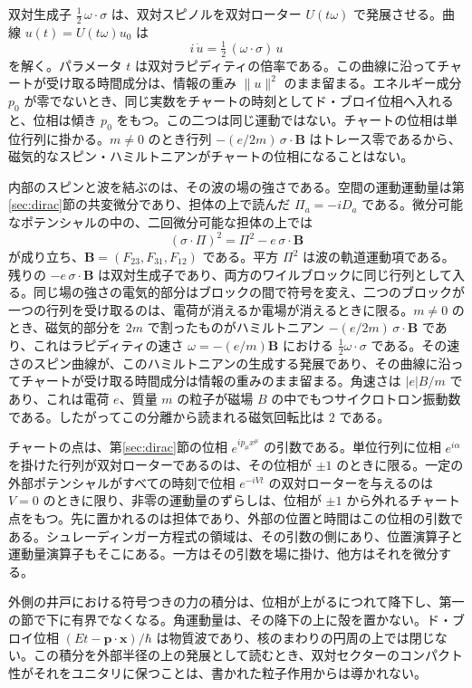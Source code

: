 \documentclass[a4paper]{article}
\begin{document}
双対生成子 $\tfrac12\,\omega\cdot\sigma$ は、双対スピノルを双対ローター $U(t\omega)$ で発展させる。曲線 $u(t)=U(t\omega)u_0$ は
\[
i\,\dot u=\tfrac12\,(\omega\cdot\sigma)\,u
\]
を解く。パラメータ $t$ は双対ラピディティの倍率である。この曲線に沿ってチャートが受け取る時間成分は、情報の重み $\lVert u\rVert^2$ のまま留まる。エネルギー成分 $p_0$ が零でないとき、同じ実数をチャートの時刻としてド・ブロイ位相へ入れると、位相は傾き $p_0$ をもつ。この二つは同じ運動ではない。チャートの位相は単位行列に掛かる。$m\neq 0$ のとき行列 $-(e/2m)\,\sigma\cdot\mathbf B$ はトレース零であるから、磁気的なスピン・ハミルトニアンがチャートの位相になることはない。

内部のスピンと波を結ぶのは、その波の場の強さである。空間の運動運動量は第\ref{sec:dirac}節の共変微分であり、担体の上で読んだ $\Pi_a=-iD_a$ である。微分可能なポテンシャルの中の、二回微分可能な担体の上では
\[
(\sigma\cdot\Pi)^2=\Pi^2-e\,\sigma\cdot\mathbf B
\]
が成り立ち、$\mathbf B=(F_{23},F_{31},F_{12})$ である。平方 $\Pi^2$ は波の軌道運動項である。残りの $-e\,\sigma\cdot\mathbf B$ は双対生成子であり、両方のワイルブロックに同じ行列として入る。同じ場の強さの電気的部分はブロックの間で符号を変え、二つのブロックが一つの行列を受け取るのは、電荷が消えるか電場が消えるときに限る。$m\neq 0$ のとき、磁気的部分を $2m$ で割ったものがハミルトニアン $-(e/2m)\,\sigma\cdot\mathbf B$ であり、これはラピディティの速さ $\omega=-(e/m)\mathbf B$ における $\tfrac12\omega\cdot\sigma$ である。その速さのスピン曲線が、このハミルトニアンの生成する発展であり、その曲線に沿ってチャートが受け取る時間成分は情報の重みのまま留まる。角速さは $|e|B/m$ であり、これは電荷 $e$、質量 $m$ の粒子が磁場 $B$ の中でもつサイクロトロン振動数である。したがってこの分離から読まれる磁気回転比は $2$ である。

チャートの点は、第\ref{sec:dirac}節の位相 $e^{ip_\mu x^\mu}$ の引数である。単位行列に位相 $e^{i\alpha}$ を掛けた行列が双対ローターであるのは、その位相が $\pm 1$ のときに限る。一定の外部ポテンシャルがすべての時刻で位相 $e^{-iVt}$ の双対ローターを与えるのは $V=0$ のときに限り、非零の運動量のずらしは、位相が $\pm 1$ から外れるチャート点をもつ。先に置かれるのは担体であり、外部の位置と時間はこの位相の引数である。シュレーディンガー方程式の領域は、その引数の側にあり、位置演算子と運動量演算子もそこにある。一方はその引数を場に掛け、他方はそれを微分する。

外側の井戸における符号つきの力の積分は、位相が上がるにつれて降下し、第一の節で下に有界でなくなる。角運動量は、その降下の上に殻を置かない。ド・ブロイ位相 \((Et-\mathbf{p}\cdot\mathbf{x})/\hbar\) は物質波であり、核のまわりの円周の上では閉じない。この積分を外部半径の上の発展として読むとき、双対セクターのコンパクト性がそれをユニタリに保つことは、書かれた粒子作用からは導かれない。
\end{document}

